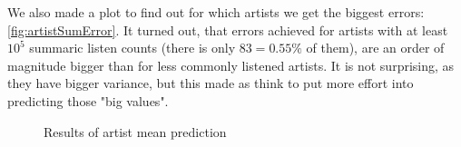 \documentclass{report}
\begin{document}
 We also made a plot to find out for which artists we get the biggest errors: \ref{fig:artistSumError}. It turned out, that errors achieved for artists with at least $10^5$ summaric listen counts (there is only $83 = 0.55\%$ of them), are an order of magnitude bigger than for less commonly listened artists. It is not surprising, as they have bigger variance, but this made as think to put more effort into predicting those "big values". 
\begin{figure}[!t]
\center
{}
\hfill
{}
\caption{Results of artist mean prediction}
\end{figure}
\end{document}
